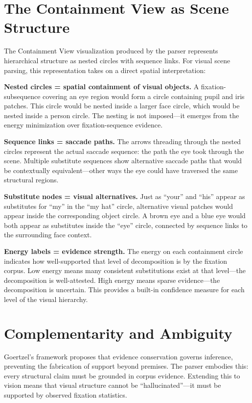 \documentclass[11pt,a4paper]{article}
\begin{document}
\section{The Containment View as Scene Structure}

The Containment View visualization produced by the parser represents hierarchical structure as nested circles with sequence links. For visual scene parsing, this representation takes on a direct spatial interpretation:

\textbf{Nested circles = spatial containment of visual objects.} A fixation-subsequence covering an eye region would form a circle containing pupil and iris patches. This circle would be nested inside a larger face circle, which would be nested inside a person circle. The nesting is not imposed---it emerges from the energy minimization over fixation-sequence evidence.

\textbf{Sequence links = saccade paths.} The arrows threading through the nested circles represent the actual saccade sequence: the path the eye took through the scene. Multiple substitute sequences show alternative saccade paths that would be contextually equivalent---other ways the eye could have traversed the same structural regions.

\textbf{Substitute nodes = visual alternatives.} Just as ``your'' and ``his'' appear as substitutes for ``my'' in the ``my hat'' circle, alternative visual patches would appear inside the corresponding object circle. A brown eye and a blue eye would both appear as substitutes inside the ``eye'' circle, connected by sequence links to the surrounding face context.

\textbf{Energy labels = evidence strength.} The energy on each containment circle indicates how well-supported that level of decomposition is by the fixation corpus. Low energy means many consistent substitutions exist at that level---the decomposition is well-attested. High energy means sparse evidence---the decomposition is uncertain. This provides a built-in confidence measure for each level of the visual hierarchy.

\section{Complementarity and Ambiguity}

Goertzel's framework proposes that evidence conservation governs inference, preventing the fabrication of support beyond premises. The parser embodies this: every structural claim must be grounded in corpus evidence. Extending this to vision means that visual structure cannot be ``hallucinated''---it must be supported by observed fixation statistics.
\end{document}

